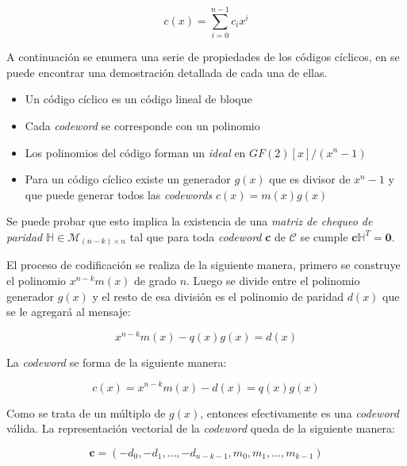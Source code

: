 \begin{equation}
c(x) = \sum_{i = 0}^{n-1}c_i x^i
\end{equation}

A continuación se enumera una serie de propiedades de los códigos cíclicos, en \cite{moon2005error} se puede encontrar una demostración detallada de cada una de ellas.

\begin{itemize}
\item{Un código cíclico es un código lineal de bloque}
\item{Cada \textit{codeword} se corresponde con un polinomio}
\item{Los polinomios del código forman un \textit{ideal} en $GF(2)[x]/(x^n-1)$}
\item{Para un código cíclico existe un generador $g(x)$ que es divisor de $x^n-1$ y que puede generar todos las \textit{codewords} $c(x)=m(x)g(x)$}
\end{itemize}

Se puede probar que esto implica la existencia de una \textit{matriz de chequeo de paridad} $\mathbb{H} \in \mathcal{M}_{(n-k)\times n}$ tal que para toda \textit{codeword} \textbf{c} de $\mathcal{C}$ se cumple $\textbf{c} \mathbb{H} ^T = \textbf{0}$.


El proceso de codificación se realiza de la siguiente manera, primero se construye el polinomio $x^{n-k}m(x)$ de grado $n$. Luego se divide entre el polinomio generador $g(x)$ y el resto de esa división es el polinomio de paridad $d(x)$ que se le agregará al mensaje:

\begin{equation}
x^{n-k}m(x) - q(x)g(x) = d(x)
\end{equation}

La \textit{codeword} se forma de la siguiente manera:

\begin{equation}
c(x) = x^{n-k}m(x)-d(x) = q(x)g(x)
\end{equation}

Como se trata de un múltiplo de $g(x)$, entonces efectivamente es una \textit{codeword} válida. La representación vectorial de la \textit{codeword} queda de la siguiente manera:

\begin{equation}
\textbf{c} = (-d_0, -d_1, ..., -d_{n-k-1}, m_0, m_1, ..., m_{k-1})
\end{equation}

